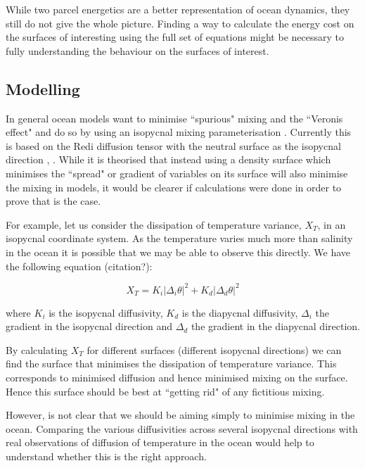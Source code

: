 While two parcel energetics are a better representation of ocean dynamics, they still do not give the whole picture. Finding a way to calculate the energy cost on the surfaces of interesting using the full set of equations might be necessary to fully understanding the behaviour on the surfaces of interest. 

\subsection{Modelling}

In general ocean models want to minimise ``spurious" mixing and the ``Veronis effect" and do so by using an isopycnal mixing parameterisation \citep{Gough1995}. Currently this is based on the Redi diffusion tensor with the neutral surface as the isopycnal direction \citet{McDougall1987}, \citet{McDougall2014}. While it is theorised that instead using a density surface which minimises the ``spread" or gradient of variables on its surface will also minimise the mixing in models, it would be clearer if calculations were done in order to prove that is the case. 

For example, let us consider the dissipation of temperature variance, $X_T$, in an isopycnal coordinate system. As the temperature varies much more than salinity in the ocean it is possible that we may be able to observe this directly. We have the following equation (citation?): 

\begin{equation}
    X_T = K_i|\Delta_i\theta|^2 + K_d|\Delta_d\theta|^2
\end{equation}

where $K_i$ is the isopycnal diffusivity, $K_d$ is the diapycnal diffusivity, $\Delta_i$ the gradient in the isopycnal direction and $\Delta_d$ the gradient in the diapycnal direction. 

By calculating $X_T$ for different surfaces (different isopycnal directions) we can find the surface that minimises the dissipation of temperature variance. This corresponds to minimised diffusion and hence minimised mixing on the surface. Hence this surface should be best at ``getting rid" of any fictitious mixing.

However, is not clear that we should be aiming simply to minimise mixing in the ocean. Comparing the various diffusivities across several isopycnal directions with real observations of diffusion of temperature in the ocean would help to understand whether this is the right approach. 

